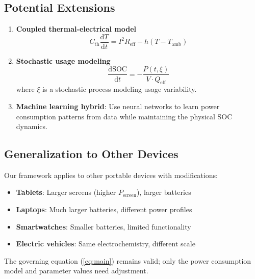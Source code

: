 \documentclass[12pt]{article}
\newcommand{\dd}{\mathrm{d}}
\newcommand{\SOC}{\text{SOC}}
\begin{document}
\subsection{Potential Extensions}

\begin{enumerate}
    \item \textbf{Coupled thermal-electrical model}
    \begin{equation}
    C_{\text{th}} \frac{\dd T}{\dd t} = I^2 R_{\text{eff}} - h(T - T_{\text{amb}})
    \end{equation}
    
    \item \textbf{Stochastic usage modeling}
    \begin{equation}
    \frac{\dd\SOC}{\dd t} = -\frac{P(t, \xi)}{V \cdot Q_{\text{eff}}}
    \end{equation}
    where $\xi$ is a stochastic process modeling usage variability.
    
    \item \textbf{Machine learning hybrid}: Use neural networks to learn power consumption patterns from data while maintaining the physical SOC dynamics.
\end{enumerate}

\subsection{Generalization to Other Devices}

Our framework applies to other portable devices with modifications:

\begin{itemize}
    \item \textbf{Tablets}: Larger screens (higher $P_{\text{screen}}$), larger batteries
    \item \textbf{Laptops}: Much larger batteries, different power profiles
    \item \textbf{Smartwatches}: Smaller batteries, limited functionality
    \item \textbf{Electric vehicles}: Same electrochemistry, different scale
\end{itemize}

The governing equation (\ref{eq:main}) remains valid; only the power consumption model and parameter values need adjustment.

\end{document}
